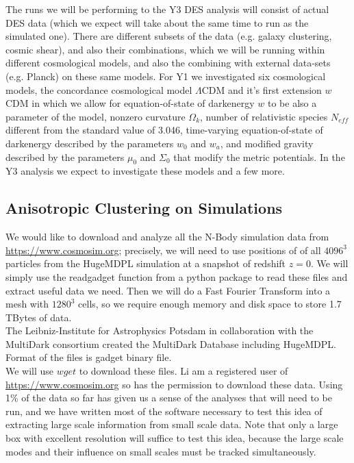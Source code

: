 \documentclass[12pt]{article}
\begin{document}
\begin{small}

The runs we will be performing to the Y3 DES analysis will consist of actual DES data (which we expect will take about the same time to run as the simulated one). There are different subsets of the data (e.g. galaxy clustering, cosmic shear), and also their combinations, which we will be running within different cosmological models, and also the combining with external data-sets (e.g. Planck) on these same models. For Y1 we investigated six cosmological models, the concordance cosmological model $\Lambda$CDM and it's first extension $w$CDM in which we allow for equation-of-state of darkenergy $w$ to be also a parameter of the model, nonzero curvature $\Omega_k$,  number of relativistic species $N_{eff}$ different from the standard value of 3.046, time-varying equation-of-state of darkenergy described by the parameters $w_0$ and $w_a$, and modified gravity described by the parameters $\mu_0$ and $\Sigma_0$ that modify the metric potentials. In the Y3 analysis we expect to investigate these models and a few more.



\subsection{Anisotropic Clustering on Simulations}
We would like to download and analyze all the N-Body simulation data from \url{https://www.cosmosim.org}; precisely, we will need to use positions of of all $4096^3$ particles from the HugeMDPL simulation at a snapshot of redshift $z=0$. 
We will simply use the readgadget function from a python package to read these files and extract useful data we need. Then we will do a Fast Fourier Transform into a mesh with $1280^3$ cells, so we require enough memory and disk space to store 1.7 TBytes of data.\\
The Leibniz-Institute for Astrophysics Potsdam in collaboration with the MultiDark consortium created the MultiDark Database including HugeMDPL. Format of the files is gadget binary file. \\
We will use $wget$ to download these files. Li am a registered user of \url{https://www.cosmosim.org} so has the permission to download these data. Using 1\% of the data so far has given us a sense of the analyses that will need to be run, and we have written most of the software necessary to test this idea of extracting large scale information from small scale data. Note that only a large box with excellent resolution will suffice to test this idea, because the large scale modes and their influence on small scales must be tracked simultaneously.%



\end{small}
\end{document}
